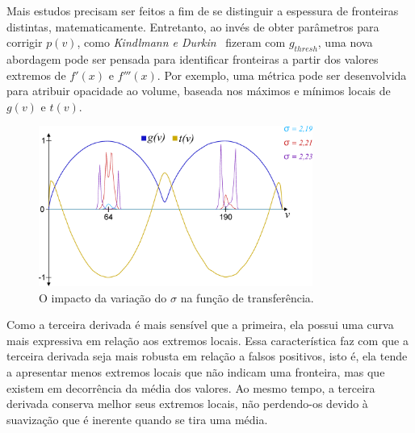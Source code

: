	Mais estudos precisam ser feitos a fim de se distinguir a espessura de fronteiras distintas, matematicamente. Entretanto, ao invés de obter parâmetros para corrigir $ p(v) $, como \textit{Kindlmann e Durkin}~\cite{gordon} fizeram com $ g_{thresh} $, uma nova abordagem pode ser pensada para identificar fronteiras a partir dos valores extremos de $ f'(x) $ e $ f'''(x) $. Por exemplo, uma métrica pode ser desenvolvida para atribuir opacidade ao volume, baseada nos máximos e mínimos locais de $ g(v) $ e $ t(v) $.
	
\begin{figure}
	\centering
	\includegraphics[width=0.8\textwidth]{images/m_sigma}
	\caption{O impacto da variação do $ \sigma $ na função de transferência.}
	\label{fig:m_sigma}
\end{figure}
	
	Como a terceira derivada é mais sensível que a primeira, ela possui uma curva mais expressiva em relação aos extremos locais. Essa característica faz com que a terceira derivada seja mais robusta em relação a falsos positivos, isto é, ela tende a apresentar menos extremos locais que não indicam uma fronteira, mas que existem em decorrência da média dos valores. Ao mesmo tempo, a terceira derivada conserva melhor seus extremos locais, não perdendo-os devido à suavização que é inerente quando se tira uma média.
	
